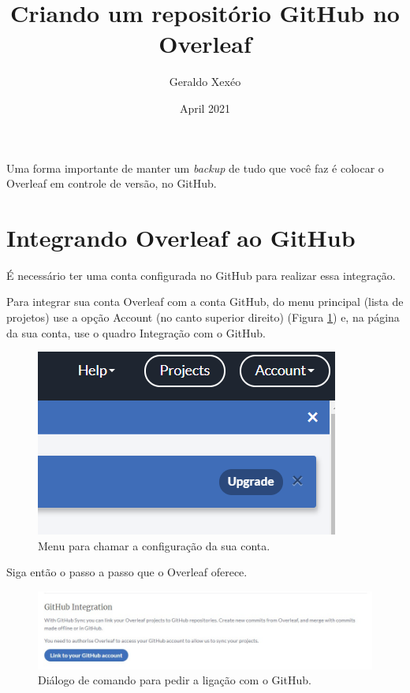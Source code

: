 \documentclass{article}
\title{Criando um repositório GitHub no Overleaf}
\author{Geraldo Xexéo}
\date{April 2021}
\begin{document}
\maketitle

Uma forma importante de manter um \textit{backup} de tudo que você faz é colocar o Overleaf em controle de versão, no GitHub.

\section{Integrando Overleaf ao GitHub}

É necessário ter uma conta configurada no GitHub para realizar essa integração.

Para integrar sua conta Overleaf com a conta GitHub, do menu principal (lista de projetos) use a opção Account (no canto superior direito) (Figura \ref{fig:accountmenu}) e, na página da sua conta, use o quadro Integração com o GitHub. 

\begin{figure}[hbt]
    \centering
    \includegraphics[width=0.9\linewidth]{Image012.png}
    \caption{Menu para chamar a configuração da sua conta.}
    \label{fig:accountmenu}
\end{figure}

Siga então o passo a passo que o Overleaf oferece.

\begin{figure}
    \centering
    \includegraphics[width=0.6\linewidth]{g1.jpeg}
    \caption{Diálogo de comando para pedir a ligação com o GitHub.}
    \label{fig:g1}
\end{figure}
\end{document}
